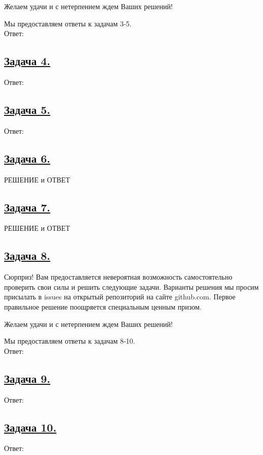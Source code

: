 Желаем удачи и с нетерпением ждем Ваших решений!

Мы предоставляем ответы к задачам 3-5.
\\

Ответ: 

\subsection*{\hyperref[sec:problem4]{Задача 4.}}\label{sec:sol_problem4}

Ответ: 

\subsection*{\hyperref[sec:problem5]{Задача 5.}}\label{sec:sol_problem5}

Ответ: 

\subsection*{\hyperref[sec:problem6]{Задача 6.}}\label{sec:sol_problem6}

РЕШЕНИЕ и ОТВЕТ

\subsection*{\hyperref[sec:problem7]{Задача 7.}}\label{sec:sol_problem7}

РЕШЕНИЕ и ОТВЕТ

\subsection*{\hyperref[sec:problem8]{Задача 8.}}\label{sec:sol_problem8}

Сюрприз! Вам предоставляется невероятная возможность самостоятельно проверить свои силы и решить следующие задачи. Варианты решения мы просим присылать в issues на открытый репозиторий на сайте github.com. Первое правильное решение поощряется специальным ценным призом. 

Желаем удачи и с нетерпением ждем Ваших решений!

Мы предоставляем ответы к задачам 8-10.
\\

Ответ: 

\subsection*{\hyperref[sec:problem9]{Задача 9.}}\label{sec:sol_problem9}

Ответ: 

\subsection*{\hyperref[sec:problem10]{Задача 10.}}\label{sec:sol_problem10}

Ответ: 


